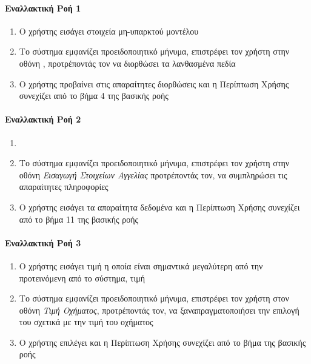 \documentclass{../ol-softwaremanual}
\begin{document}
	\paragraph{Εναλλακτική Ροή 1}
	
	\begin{enumerate}
		\item O χρήστης εισάγει στοιχεία μη-υπαρκτού μοντέλου
		\item Το σύστημα εμφανίζει προειδοποιητικό μήνυμα, επιστρέφει τον χρήστη στην οθόνη , προτρέποντάς τον να διορθώσει τα λανθασμένα πεδία
		\item Ο χρήστης προβαίνει στις απαραίτητες διορθώσεις και η Περίπτωση Χρήσης συνεχίζει από το βήμα 4 της βασικής ροής
	\end{enumerate}
	
	\paragraph{Εναλλακτική Ροή 2}
	
	\begin{enumerate}
		\item {}
		\item Το σύστημα εμφανίζει προειδοποιητικό μήνυμα, επιστρέφει τον χρήστη στην οθόνη \textit{Εισαγωγή Στοιχείων Αγγελίας} προτρέποντάς τον, να συμπληρώσει τις απαραίτητες πληροφορίες
		\item Ο χρήστης εισάγει τα απαραίτητα δεδομένα και η Περίπτωση Χρήσης συνεχίζει από το βήμα 11 της βασικής ροής
	\end{enumerate}
	
	\paragraph{Εναλλακτική Ροή 3}
	
	\begin{enumerate}
		\item Ο χρήστης εισάγει τιμή η οποία είναι σημαντικά μεγαλύτερη από την προτεινόμενη από το σύστημα, τιμή
		\item Το σύστημα εμφανίζει προειδοποιητικό μήνυμα, επιστρέφει τον χρήστη στον οθόνη \textit{Τιμή Οχήματος}, προτρέποντάς τον, να ξαναπραγματοποιήσει την επιλογή του σχετικά με την τιμή του οχήματος
		\item Ο χρήστης επιλέγει και η Περίπτωση Χρήσης συνεχίζει από το βήμα  της βασικής ροής
	\end{enumerate}
	
\end{document}
